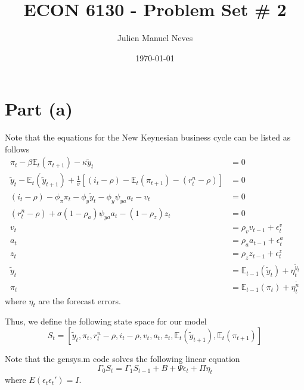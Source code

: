 \documentclass[12pt]{article}
\title{ECON 6130 - Problem Set \# 2}
\date{\today}
\author{Julien Manuel Neves}
\theoremstyle{definition}
\newcommand\E{\mathbb{E}}
\begin{document}
\maketitle

\section*{Part (a)}

Note that the equations for the New Keynesian business cycle can be listed as follows
\begin{align*}
\pi_t-\beta \E_t(\pi_{t+1}) -\kappa \tilde{y}_t	& = 0\\
 \tilde{y}_t - \E_t( \tilde{y}_{t+1}) + \frac{1}{\sigma}[(i_t-\rho)- \E_t(\pi_{t+1})-(r_t^n-\rho)]	& = 0\\
(i_t-\rho) -\phi_{\pi}\pi_t -\phi_y\tilde{y}_t - \phi_y\psi_{ya} a_t-v_t	& = 0\\
	(r_t^n-\rho) +\sigma(1-\rho_a)\psi_{ya}a_t -(1-\rho_z)z_t	& = 0\\
	v_t& = \rho_v v_{t-1} +\epsilon_t^v \\
	a_t& = \rho_a a_{t-1}+\epsilon_t^a \\
	z_t& = \rho_z z_{t-1}+\epsilon_t^z \\
	\tilde{y}_{t}& =\E_{t-1}(\tilde{y}_{t})+\eta_t^{\tilde{y}_t}\\
	\pi_{t}& = \E_{t-1}(\pi_{t})+ \eta_t^{\tilde{n}} 
\end{align*}
where $\eta_t$ are the forecast errors.

Thus, we define the following state space for our model
\[
S_t = [\tilde{y}_t,\pi_t,r_t^n-\rho,i_t-\rho,v_t,a_t,z_t,\E_t(\tilde{y}_{t+1}),\E_t(\pi_{t+1})]
\]

Note that the gensys.m code solves the following linear equation
\[
\Gamma_0 S_t = \Gamma_1 S_{t-1} + B +\Psi \epsilon_t + \Pi \eta_t
\]
where $E(\epsilon_t\epsilon_t')=I$.
\end{document}
